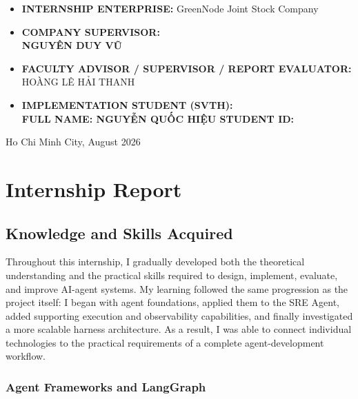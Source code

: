 \documentclass[a4paper]{article}
\theoremstyle{definition}
\begin{document}
\begin{titlepage}
\begin{itemize}
\renewcommand\labelitemi{--}
\item {\Large \bfseries INTERNSHIP ENTERPRISE:} {\Large \mdseries GreenNode Joint Stock Company}
\item {\Large \bfseries COMPANY SUPERVISOR: \mdseries \\ NGUYÊN DUY VŨ}
\item {\Large \bfseries FACULTY ADVISOR / SUPERVISOR / REPORT EVALUATOR:}\\
      {\Large \mdseries HOÀNG LÊ HẢI THANH}
\item {\Large \bfseries IMPLEMENTATION STUDENT (SVTH):}\\
      {\Large \bfseries FULL NAME: \mdseries NGUYỄN QUỐC HIỆU \quad \bfseries STUDENT ID: }\\
\end{itemize}
\vspace{0.5cm}
\begin{center}
{\Large Ho Chi Minh City, August 2026}
\end{center}
\end{titlepage}



\newpage
\renewcommand{\contentsname}{Contents} %
\tableofcontents
\newpage


\section{Internship Report}


\subsection{Knowledge and Skills Acquired}

Throughout this internship, I gradually developed both the theoretical understanding and the practical skills required to design, implement, evaluate, and improve AI-agent systems. My learning followed the same progression as the project itself: I began with agent foundations, applied them to the SRE Agent, added supporting execution and observability capabilities, and finally investigated a more scalable harness architecture. As a result, I was able to connect individual technologies to the practical requirements of a complete agent-development workflow.

\subsubsection{Agent Frameworks and LangGraph}
\end{document}
